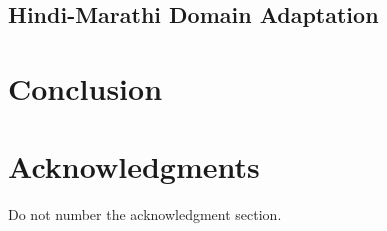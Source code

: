 \documentclass[11pt,letterpaper]{article}
\begin{document}
\subsection{Hindi-Marathi Domain Adaptation}


\section{Conclusion}


\section*{Acknowledgments}

Do not number the acknowledgment section.




\end{document}
